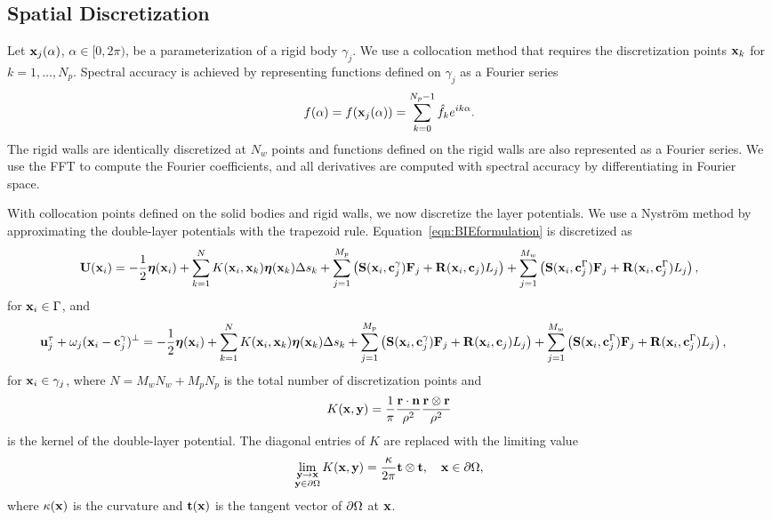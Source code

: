 \documentclass[AMA,STIX1COL]{WileyNJD-v2}
\begin{document}
\subsection{Spatial Discretization}\label{sec:spatial}
Let ${\mathbf{x}}_j(\alpha)$, $\alpha \in [0,2\pi)$, be a parameterization of a
rigid body $\gamma_j$.  We use a collocation method that requires
the discretization points ${\mathbf{x}}_k$ for $k=1,\ldots,N_p$.  Spectral
accuracy is achieved by representing functions defined on $\gamma_j$ as
a Fourier series
\begin{align}
  f(\alpha) = f({\mathbf{x}}_j(\alpha)) = 
    \sum_{k = 0}^{N_p-1} \hat{f}_k e^{ik\alpha}.
\end{align}
The rigid walls are identically discretized at $N_w$ points and
functions defined on the rigid walls are also represented as a Fourier
series.  We use the FFT to compute the Fourier coefficients, and all
derivatives are computed with spectral accuracy by differentiating in
Fourier space.

With collocation points defined on the solid bodies and rigid walls, we
now discretize the layer potentials.  We use a Nystr\"om method by
approximating the double-layer potentials with the trapezoid rule.
Equation~\eqref{eqn:BIEformulation} is discretized as
\begin{equation*}
  \begin{aligned}
  {\mathbf{U}}({\mathbf{x}}_i) = -\frac{1}{2}{\boldsymbol\eta}({\mathbf{x}}_i) + 
  \sum_{k=1}^{N} K({\mathbf{x}}_i,{\mathbf{x}}_k) {\boldsymbol\eta}({\mathbf{x}}_k) \Delta s_k
    + \sum_{j=1}^{M_p} \left(\mathbf{S}({\mathbf{x}}_i,{\mathbf{c}}^\gamma_j){\mathbf{F}}_j +
    \mathbf{R}({\mathbf{x}}_i,{\mathbf{c}}_j)L_j\right) 
    + \sum_{j=1}^{M_w} \left(\mathbf{S}({\mathbf{x}}_i,{\mathbf{c}}^\Gamma_j){\mathbf{F}}_j +
    \mathbf{R}({\mathbf{x}}_i,{\mathbf{c}}^\Gamma_j)L_j\right),
  \end{aligned}
\end{equation*}
for ${\mathbf{x}}_i \in \Gamma$, and
\begin{equation*}
  \begin{aligned}
{\mathbf{u}}^\tau_j + \omega_j({\mathbf{x}}_i - {\mathbf{c}}^\gamma_j)^\perp =
-\frac{1}{2}{\boldsymbol\eta}({\mathbf{x}}_i) +
\sum_{k=1}^{N} K({\mathbf{x}}_i,{\mathbf{x}}_k) {\boldsymbol\eta}({\mathbf{x}}_k) \Delta s_k
    &+ \sum_{j=1}^{M_p} \left(\mathbf{S}({\mathbf{x}}_i,{\mathbf{c}}^\gamma_j){\mathbf{F}}_j +
    \mathbf{R}({\mathbf{x}}_i,{\mathbf{c}}_j)L_j\right) 
    + \sum_{j=1}^{M_w} \left(\mathbf{S}({\mathbf{x}}_i,{\mathbf{c}}^\Gamma_j){\mathbf{F}}_j +
    \mathbf{R}({\mathbf{x}}_i,{\mathbf{c}}^\Gamma_j)L_j\right),
  \end{aligned}
\end{equation*}
for ${\mathbf{x}}_i \in \gamma_j$, where $N = M_w N_w + M_p N_p$ is the total
number of discretization points and
\begin{align*}
  K({\mathbf{x}},{\mathbf{y}}) = \frac{1}{\pi} \frac{{\mathbf{r}} \cdot {\mathbf{n}}}{\rho^2} 
               \frac{{\mathbf{r}} \otimes {\mathbf{r}}}{\rho^2}
\end{align*}
is the kernel of the double-layer potential.  The diagonal entries of
$K$ are replaced with the limiting value
\begin{align*}
  \lim_{\substack{{\mathbf{y}} \rightarrow {\mathbf{x}} \\ {\mathbf{y}} \in {\partial}\Omega}} 
    K({\mathbf{x}},{\mathbf{y}}) = \frac{\kappa}{2\pi}{\mathbf{t}}\otimes{\mathbf{t}},
    \quad {\mathbf{x}} \in {\partial}\Omega,
\end{align*}
where $\kappa({\mathbf{x}})$ is the curvature and ${\mathbf{t}}({\mathbf{x}})$ is the tangent
vector of ${\partial}\Omega$ at ${\mathbf{x}}$.
\end{document}
